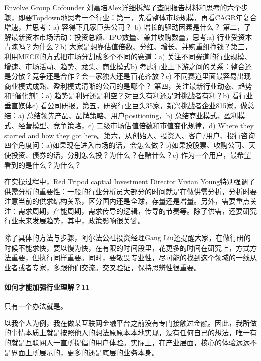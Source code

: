 \documentclass[letterpaper,11pt,english]{sphinxmanual}
\begin{document}
Envolve Group Co\sphinxhyphen{}founder
刘嘉培Alex详细拆解了查阅报告材料和思考的六个步骤，即要Top\sphinxhyphen{}down地思考一个行业：第一，先看整体市场规模，再看CAGR年复合增速，并思考：a)
容得下几家巨头公司？ b) 增长的驱动因素是什么？
第二，了解最新资本市场活动：投资总额、IPO数量、兼并收购数量，思考:a)
行业受资本青睐吗？为什么？b)
大家是想靠估值倍数、分红、增长、并购重组挣钱？第三，利用MECE的方式把市场分割成多个不同的赛道：a)
关注不同赛道的行业规模、增速、市场活动、趋势、龙头、商业模式b)
考虑行业上下游之间的关系：整合还是分散？竞争还是合作？会一家独大还是百花齐放？c)
不同赛道里面最容易出现商业模式成熟、盈利模式清晰的公司的是哪个？
第四，关注最新行业动态、趋势和“催化剂”：a)
趋势是利好还是利空？对巨头有利还是对挑战者有利？b) 看行业垂直媒体c)
看公司研报。第五，研究行业巨头3\sphinxhyphen{}5家，新兴挑战者企业8\sphinxhyphen{}15家，做总结：a)
总结领先产品、品牌策略、用户positioning，b)
总结商业模式、盈利模式、经营模型、竞争策略，c)
二级市场估值倍数和市值变化规律，d) Where they started and how they got
here。第六，从创始人、投资人、客户/用户、投行咨询四个角度问：a)如果现在进入市场的话，会怎么做？b)如果投股票、收购公司、天使投资、债券的话，分别怎么投？为什么？在赌什么？c)
作为一个用户，最希望看到的是什么？为什么？

在实操过程中，Red Tripod captial Investment Director Vivian
Young特别强调了供需分析的重要性：一般的行业分析员大部分的时间就是在做供需分析，分析时要注意当前的供求结构关系，区分国内还是全球，存量还是增量。另外，需要重点关注：需求周期，产能周期，需求传导的逻辑，传导的节奏等。除了供需，还要研究行业未来发展趋势，其中，政策影响很关键。

除了具体的方法与步骤，阿尔法公社投资经理Gang
Liu还提醒大家，在做行研的时候不能求快，要以慢为快，在有限的时间段里，花更多的时间在研究上，方式方法重要，但执行同样重要。同时，要敬畏专业性，尽可能的找到这个领域的一线从业者或者专家，多跟他们交流。交叉验证，保持思辨性很重要。


\paragraph{如何才能加强行业理解？11\sphinxfootnotemark[439]}
\label{\detokenize{chapter_knowledge/industry_analysis:id22}}%
\begin{footnotetext}[439]\sphinxAtStartFootnote
{}
%
\end{footnotetext}\ignorespaces 
只有一个办法就是。

以我个人为例，我在做某互联网金融平台之前没有专门接触过金融。因此，我所做的事情本质上就是按照他人的想法原原本本地实现，没有任何自己的想法，唯一有的就是互联网人一直所提倡的用户体验。实际上，在产业层面，核心的体验远远不是界面上所展示的，更多的还是底层的业务本身。
\end{document}
